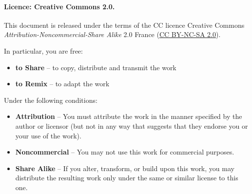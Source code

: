 
\paragraph{Licence: Creative Commons 2.0.}

{\footnotesize
  This document is released under the terms of the CC licence Creative Commons 
  \emph{Attribution-Noncommercial-Share Alike} 2.0 France
  (\href{http://creativecommons.org/licenses/by-nc-sa/2.0/fr/deed.en_US}{CC BY-NC-SA 2.0}).

  \noindent In particular, you are free:
  \begin{itemize}
    \item \textbf{to Share} -- to copy, distribute and transmit the work
    \item \textbf{to Remix} --  to adapt the work
  \end{itemize}

  \noindent Under the following conditions:
  \begin{itemize}
    \item \textbf{Attribution}   --  You must attribute the work in the manner
      specified by the author or licensor (but not in any way that suggests that 
      they endorse you or your use of the work).
    \item \textbf{Noncommercial} -- You may not use this work for commercial purposes. 
    \item \textbf{Share Alike}   --  If you alter, transform, or build upon this work,
      you may distribute the resulting work only under the same or similar license
      to this one.  
  \end{itemize}
  \vspace{1em}

}
